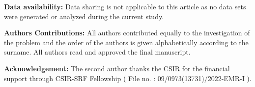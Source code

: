 \documentclass[a4paper,12pt]{amsart}
\theoremstyle{definition}
\begin{document}
\vspace{4mm}

\noindent\textbf{Data availability:}
Data sharing is not applicable to this article as no data sets were generated or analyzed during the current study.\vspace{2mm}

\noindent\textbf{Authors Contributions:}
All authors contributed equally to the investigation of the problem and the order of the authors is given alphabetically according to the surname. All authors read and approved the final manuscript.\vspace{2mm}


\noindent\textbf{Acknowledgement:}
The second author thanks the CSIR for the financial support through CSIR-SRF Fellowship ( File no. : 09/0973(13731)/2022-EMR-I ).
\end{document}
